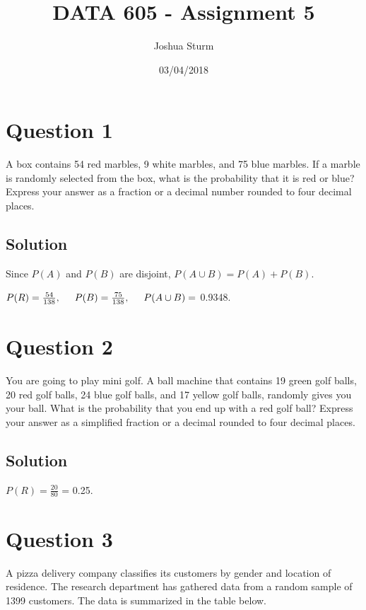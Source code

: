 \documentclass[]{article}
\title{DATA 605 - Assignment 5}
\author{Joshua Sturm}
\date{03/04/2018}
\begin{document}
\maketitle

\section{Question 1}\label{question-1}

A box contains 54 red marbles, 9 white marbles, and 75 blue marbles. If
a marble is randomly selected from the box, what is the probability that
it is red or blue? Express your answer as a fraction or a decimal number
rounded to four decimal places.

\subsection{Solution}\label{solution}

Since \(P(A)\) and \(P(B)\) are disjoint, \(P(A \cup B) = P(A) + P(B)\).

\(P(R) = \frac{54}{138}, \hspace{5mm} P(B) = \frac{75}{138}, \hspace{5mm} P(A \cup B) =\)
0.9348.

\section{Question 2}\label{question-2}

You are going to play mini golf. A ball machine that contains 19 green
golf balls, 20 red golf balls, 24 blue golf balls, and 17 yellow golf
balls, randomly gives you your ball. What is the probability that you
end up with a red golf ball? Express your answer as a simplified
fraction or a decimal rounded to four decimal places.

\subsection{Solution}\label{solution-1}

\(P(R) = \frac{20}{80}\) = 0.25.

\section{Question 3}\label{question-3}

A pizza delivery company classifies its customers by gender and location
of residence. The research department has gathered data from a random
sample of 1399 customers. The data is summarized in the table below.
\end{document}
